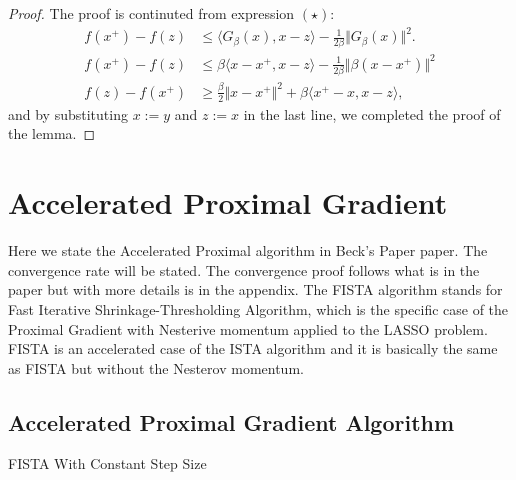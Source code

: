 \documentclass[]{article}
\theoremstyle{definition}
\begin{document}
        \begin{proof}
            The proof is continuted from expression $(\star)$: 
            \begin{align*}
                f(x^+) - f(z) 
                &\le 
                \langle G_\beta(x), x - z\rangle - \frac{1}{2\beta}\Vert G_\beta(x)\Vert^2. 
                \\
                f(x^+) - f(z) & \le 
                \beta\langle x - x^+, x - z\rangle - \frac{1}{2\beta}\Vert \beta (x - x^+)\Vert^2
                \\
                f(z) - f(x^+) & \ge
                \frac{\beta}{2}\Vert x - x^+\Vert^2
                 + 
                \beta\langle x^+ - x, x - z\rangle, 
            \end{align*}
            and by substituting $x :=y$ and $z := x$ in the last line, we completed the proof of the lemma. 
        \end{proof}

\section{Accelerated Proximal Gradient}\label{sec:apg_intro}
    Here we state the Accelerated Proximal algorithm in Beck's Paper paper\cite{paper:FISTA}. The convergence rate will be stated. The convergence proof follows what is in the paper but with more details is in the appendix. The FISTA algorithm stands for Fast Iterative Shrinkage-Thresholding Algorithm, which is the specific case of the Proximal Gradient with Nesterive momentum applied to the LASSO problem. FISTA is an accelerated case of the ISTA algorithm and it is basically the same as FISTA but without the Nesterov momentum. 
    
    \subsection{Accelerated Proximal Gradient Algorithm} 
        \begin{algorithm}[H]\label{alg:fista_1} 
        \begin{algorithmic}[1]
                \ENDIF
            \ENDFOR
        \end{algorithmic}\caption{FISTA With Constant Step Size}
        \end{algorithm}
\end{document}
